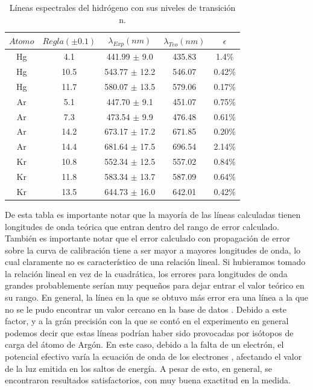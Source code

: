 \documentclass[%
 reprint,
 amsmath,amssymb,
 aps,
]{revtex4-1}
\begin{document}
\begin{table}[h!]
\centering
 \begin{tabular}{|c|c|c|c|c|} 
 \hline
 $Atomo$ & $Regla (\pm0.1) $ & $\lambda_{Exp} (nm)$ & $\lambda_{Teo} (nm)$ & $\epsilon$\\ [0.5ex] 
 \hline\hline
 Hg & 4.1  &	441.99 $\pm$ 9.0  & 435.83 & 1.4\% \\
 Hg & 10.5 &	543.77 $\pm$ 12.2 & 546.07 & 0.42\% \\
 Hg & 11.7 &	580.07 $\pm$ 13.5 & 579.06 & 0.17\% \\
 \hline
 Ar & 5.1  &447.70 $\pm$ 9.1  & 451.07 & 0.75\% \\
 Ar & 7.3  &473.54 $\pm$ 9.9  & 476.48 & 0.61\% \\
 Ar & 14.2 &673.17 $\pm$ 17.2 & 671.85 & 0.20\% \\
 Ar & 14.4 &	681.64 $\pm$ 17.5 & 696.54 & 2.14\% \\
 \hline
 Kr & 10.8 &	 552.34  $\pm$ 12.5 & 557.02 & 0.84\% \\
 Kr & 11.8 &	 583.34  $\pm$ 13.7 & 587.09 & 0.64\% \\
 Kr & 13.5 &	 644.73  $\pm$ 16.0 & 642.01 & 0.42\% \\
[1ex] 
 \hline
 \end{tabular}
 \caption{Líneas espectrales del hidrógeno con sus niveles de transición n.}
 \label{table:otros}
\end{table}

De esta tabla es importante notar que la mayoría de las líneas calculadas tienen longitudes de onda teórica que entran dentro del rango de error calculado. También es importante notar que el error calculado con propagación de error sobre la curva de calibración tiene a ser mayor a mayores longitudes de onda, lo cual claramente no es característico de una relación lineal. Si hubieramos tomado la relación lineal en vez de la cuadrática, los errores para longitudes de onda grandes probablemente serían muy pequeños para dejar entrar el valor teórico en su rango. En general, la línea en la que se obtuvo más error era una línea a la que no se le pudo encontrar un valor cercano en la base de datos \cite{base}. Debido a este factor, y a la grán precisión con la que se contó en el experimento en general podemos decir que estas líneas podrían haber sido provocadas por isótopos de carga del átomo de Argón. En este caso, debido a la falta de un electrón, el potencial efectivo varía la ecuación de onda de los electrones , afectando el valor de la luz emitida en los saltos de energía. A pesar de esto, en general, se encontraron resultados satisfactorios, con muy buena exactitud en la medida.\\
\end{document}
